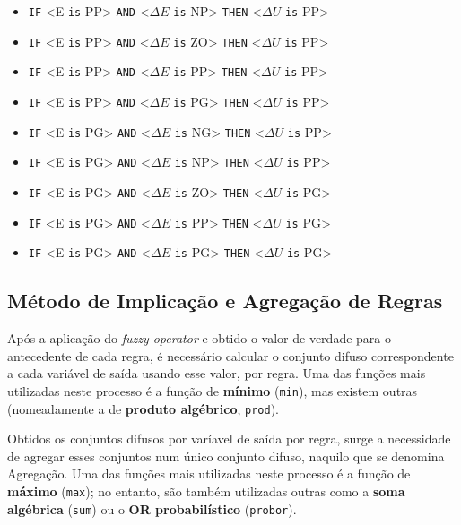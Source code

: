 \documentclass{article}
\begin{document}
\begin{itemize}
	\item \texttt{IF} <E \texttt{is} PP> \texttt{AND} <$\Delta E$ \texttt{is} NP> \texttt{THEN} <$\Delta U$ \texttt{is} PP>
	\item \texttt{IF} <E \texttt{is} PP> \texttt{AND} <$\Delta E$ \texttt{is} ZO> \texttt{THEN} <$\Delta U$ \texttt{is} PP>
	\item \texttt{IF} <E \texttt{is} PP> \texttt{AND} <$\Delta E$ \texttt{is} PP> \texttt{THEN} <$\Delta U$ \texttt{is} PP>
	\item \texttt{IF} <E \texttt{is} PP> \texttt{AND} <$\Delta E$ \texttt{is} PG> \texttt{THEN} <$\Delta U$ \texttt{is} PP>
	\item \texttt{IF} <E \texttt{is} PG> \texttt{AND} <$\Delta E$ \texttt{is} NG> \texttt{THEN} <$\Delta U$ \texttt{is} PP>
	\item \texttt{IF} <E \texttt{is} PG> \texttt{AND} <$\Delta E$ \texttt{is} NP> \texttt{THEN} <$\Delta U$ \texttt{is} PP>
	\item \texttt{IF} <E \texttt{is} PG> \texttt{AND} <$\Delta E$ \texttt{is} ZO> \texttt{THEN} <$\Delta U$ \texttt{is} PG>
	\item \texttt{IF} <E \texttt{is} PG> \texttt{AND} <$\Delta E$ \texttt{is} PP> \texttt{THEN} <$\Delta U$ \texttt{is} PG>
	\item \texttt{IF} <E \texttt{is} PG> \texttt{AND} <$\Delta E$ \texttt{is} PG> \texttt{THEN} <$\Delta U$ \texttt{is} PG>
\end{itemize}

\clearpage

\subsection{Método de Implicação e Agregação de Regras}
\indent \indent Após a aplicação do \textit{fuzzy operator} e obtido o valor de verdade para o antecedente de cada regra, é necessário calcular o conjunto difuso correspondente a cada variável de saída usando esse valor, por regra. Uma das funções mais utilizadas neste processo é a função de \textbf{mínimo} (\texttt{min}), mas existem outras (nomeadamente a de \textbf{produto algébrico}, \texttt{prod}).

Obtidos os conjuntos difusos por varíavel de saída por regra, surge a necessidade de agregar esses conjuntos num único conjunto difuso, naquilo que se denomina Agregação. Uma das funções mais utilizadas neste processo é a função de \textbf{máximo} (\texttt{max}); no entanto, são também utilizadas outras como a \textbf{soma algébrica} (\texttt{sum}) ou o \textbf{OR probabilístico} (\texttt{probor}).
\end{document}
